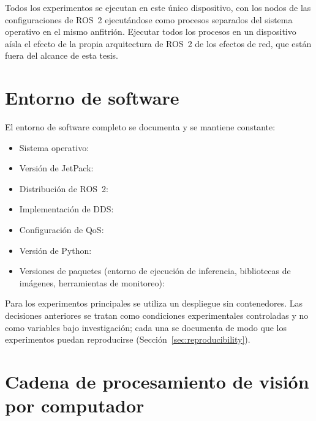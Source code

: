 Todos los experimentos se ejecutan en este único dispositivo, con los nodos
de las configuraciones de ROS~2 ejecutándose como procesos separados del
sistema operativo en el mismo anfitrión. Ejecutar todos los procesos en un
dispositivo aísla el efecto de la propia arquitectura de ROS~2 de los
efectos de red, que están fuera del alcance de esta tesis.

\section{Entorno de software}
\label{sec:software-environment}

El entorno de software completo se documenta y se mantiene constante:

\begin{itemize}
  \item Sistema operativo: 
  \item Versión de JetPack: 
  \item Distribución de ROS~2: 
  \item Implementación de DDS: 
  \item Configuración de QoS: 
  \item Versión de Python: 
  \item Versiones de paquetes (entorno de ejecución de inferencia,
        bibliotecas de imágenes, herramientas de monitoreo): 
\end{itemize}

Para los experimentos principales se utiliza un despliegue sin
contenedores. Las decisiones anteriores se tratan como condiciones
experimentales controladas y no como variables bajo investigación; cada una
se documenta de modo que los experimentos puedan reproducirse
(Sección~\ref{sec:reproducibility}).

\section{Cadena de procesamiento de visión por computador}
\label{sec:pipeline}

